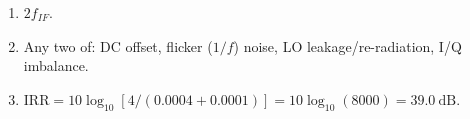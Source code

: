 \begin{enumerate}[leftmargin=1.6em,itemsep=2pt]
\item $2f_{IF}$.
\item Any two of: DC offset, flicker ($1/f$) noise, LO leakage/re-radiation, I/Q imbalance.
\item $\text{IRR} = 10\log_{10}[4/(0.0004+0.0001)] = 10\log_{10}(8000) = 39.0\ \text{dB}$.
\end{enumerate}
